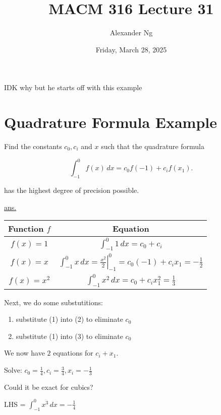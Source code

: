 \documentclass[12pt]{article}
\renewcommand{\arraystretch}{1.25} %
\begin{document}
\title{MACM 316 Lecture 31}
\author{Alexander Ng}
\date{Friday, March 28, 2025}

\maketitle

IDK why but he starts off with this example

\section{Quadrature Formula Example}

Find the constants $c_0, c_i$ and $x$ such that the quadrature formula

\begin{equation*}
  \int_{-1}^{0} f(x) \, dx = c_0 f(-1) + c_i f(x_1)
.\end{equation*}

has the highest degree of precision possible.

\uline{ans.}
 
\renewcommand{\arraystretch}{3}
\begin{center}
  \begin{tabular}{c|c}
    Function $f$ & Equation \\
    \hline
    $f(x) = 1$ & $\displaystyle \int_{-1}^{0} 1 \, dx = c_0 + c_i$ \\
    $f(x) = x$ & $\displaystyle \int_{-1}^{0} x \, dx = \left. \frac{x^2}{2} \right|_{-1}^0 = c_0 (-1) + c_i x_1 = -\frac{1}{2}$ \\
    $f(x) = x^2$ & $\displaystyle \int_{-1}^{0} x^2 \, dx = c_0 + c_i x_1^2 = \frac{1}{3}$ \\
  \end{tabular}
\end{center}

Next, we do some substutitions:

\begin{enumerate}
\item substitute (1) into (2) to eliminate $c_0$
\item substitute (1) into (3) to eliminate $c_0$
\end{enumerate}

We now have $2$ equations for $c_i + x_1$.

Solve: $c_0 = \frac{1}{4}, c_i = \frac{3}{4}, x_i = -\frac{1}{3}$

Could it be exact for cubics?

LHS = $\int_{-1}^{0} x^3 \, dx = -\frac{1}{4}$
\end{document}
